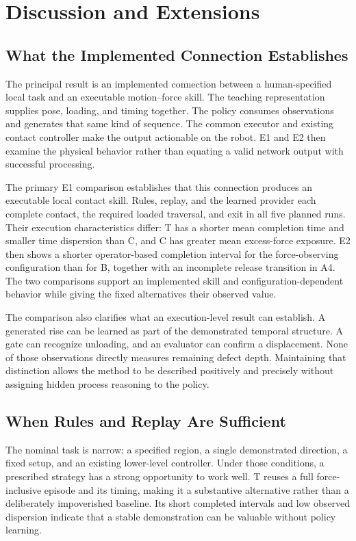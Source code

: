\chapter{Discussion and Extensions}
\label{chap:discussion}

\section{What the Implemented Connection Establishes}
The principal result is an implemented connection between a human-specified local task and an executable motion--force skill. The teaching representation supplies pose, loading, and timing together. The policy consumes observations and generates that same kind of sequence. The common executor and existing contact controller make the output actionable on the robot. E1 and E2 then examine the physical behavior rather than equating a valid network output with successful processing.

The primary E1 comparison establishes that this connection produces an executable local contact skill. Rules, replay, and the learned provider each complete contact, the required loaded traversal, and exit in all five planned runs. Their execution characteristics differ: T has a shorter mean completion time and smaller time dispersion than C, and C has greater mean excess-force exposure. E2 then shows a shorter operator-based completion interval for the force-observing configuration than for B, together with an incomplete release transition in A4. The two comparisons support an implemented skill and configuration-dependent behavior while giving the fixed alternatives their observed value.

The comparison also clarifies what an execution-level result can establish. A generated rise can be learned as part of the demonstrated temporal structure. A gate can recognize unloading, and an evaluator can confirm a displacement. None of those observations directly measures remaining defect depth. Maintaining that distinction allows the method to be described positively and precisely without assigning hidden process reasoning to the policy.

\section{When Rules and Replay Are Sufficient}
The nominal task is narrow: a specified region, a single demonstrated direction, a fixed setup, and an existing lower-level controller. Under those conditions, a prescribed strategy has a strong opportunity to work well. T reuses a full force-inclusive episode and its timing, making it a substantive alternative rather than a deliberately impoverished baseline. Its short completed intervals and low observed dispersion indicate that a stable demonstration can be valuable without policy learning.

